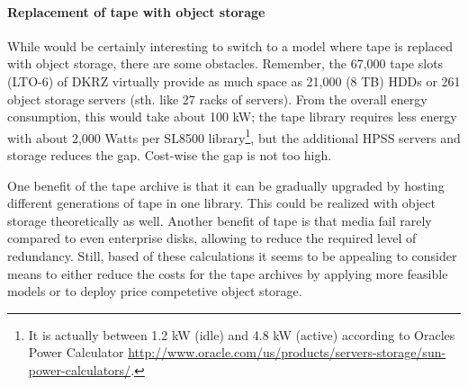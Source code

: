 \documentclass{../../template/esiwace-report}
\begin{document}
%
%
%
%
%
%
%
%
%



\paragraph{Replacement of tape with object storage}

While would be certainly interesting to switch to a model where tape is replaced with object storage, there are some obstacles.
Remember, the 67,000 tape slots (LTO-6) of DKRZ virtually provide as much space as 21,000 (8 TB) HDDs or 261 object storage servers (sth. like 27 racks of servers).
From the overall energy consumption, this would take about 100 kW; the tape library requires less energy with about 2,000 Watts per SL8500 library\footnote{
It is actually between 1.2 kW (idle) and 4.8 kW (active) according to Oracles Power Calculator \url{http://www.oracle.com/us/products/servers-storage/sun-power-calculators/}.}, but the additional HPSS servers and storage reduces the gap.
Cost-wise the gap is not too high.

One benefit of the tape archive is that it can be gradually upgraded by hosting different generations of tape in one library.
This could be realized with object storage theoretically as well.
Another benefit of tape is that  media fail rarely compared to even enterprise disks, allowing to reduce the required level of redundancy.
Still, based of these calculations it seems to be appealing to consider means to either reduce the costs for the tape archives by applying more feasible models or to deploy price competetive object storage.
\end{document}
